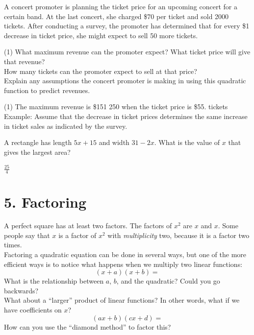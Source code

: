\documentclass[12pt,fleqn]{book}
\newcommand{\prb}[1]{\begin{Exercise}#1\end{Exercise}}
\newcommand{\sol}[1]{\begin{Answer}#1\end{Answer}}
\begin{document}
\prb{A concert promoter is planning the ticket
	price for an upcoming concert for a certain
	band. At the last concert, she charged
	\$70 per ticket and sold 2000 tickets. After
	conducting a survey, the promoter has
	determined that for every \$1 decrease
	in ticket price, she might expect to sell
	50 more tickets.
	\begin{tasks}(1)
		\task What maximum revenue can the
		promoter expect? What ticket price
		will give that revenue?\\[1in]
		\task How many tickets can the promoter
		expect to sell at that price?\\[1in]
		\task Explain any assumptions the concert
		promoter is making in using this
		quadratic function to predict revenues.\\[1in]
	\end{tasks}
}
\sol{
	\begin{tasks}(1)
		\task The maximum revenue is \$151 250 when the ticket price is \$55.
		\task 2750 tickets
		\task Example: Assume that the decrease in ticket prices determines the same increase in ticket sales as indicated by the survey.
	\end{tasks}
}

\prb{A rectangle has length $5x+15$ and width $31-2x$.  What is the value of $x$ that gives the largest area?}
\sol{$\frac{25}{4}$}










\chapter{5. Factoring}
A perfect square has at least two factors.  The factors of $x^2$ are $x$ and $x$.  Some people say that $x$ is a factor of $x^2$ with \emph{multiplicity} two, because it is a factor two times.
\\[1em]
Factoring a quadratic equation can be done in several ways, but one of the more efficient ways is to notice what happens when we multiply two linear functions:
\[
    (x+a)(x+b) =
\]
What is the relationship between $a$, $b$, and the quadratic?  Could you go backwards?
\\[1in]
What about a ``larger'' product of linear functions?  In other words, what if we have coefficients on $x$?
\[ 
    (ax+b)(cx+d) = 
\]
How can you use the ``diamond method'' to factor this?
\\[2in]
\end{document}
